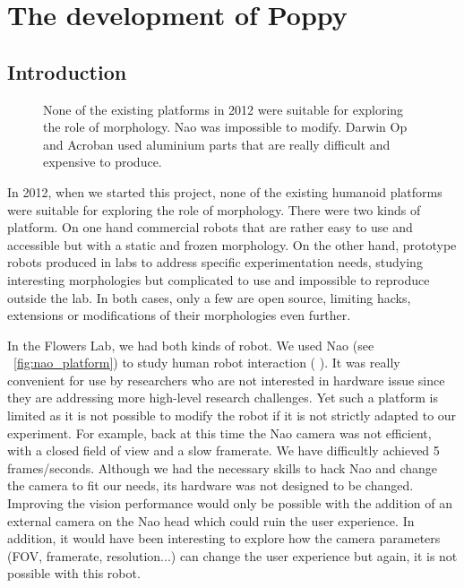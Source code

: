 
\cleartoleftpage

\chapter{The development of Poppy} %
\label{cha:poppy-dev}

\section{Introduction} %

\begin{figure}[tb]
\centering
    \hfil
    \hfil
    \caption{None of the existing platforms in 2012 were suitable for exploring the role of morphology. Nao was impossible to modify. Darwin Op and Acroban used aluminium parts that are really difficult and expensive to produce.}
    \label{fig:2012_Humanoids}
\end{figure}

In 2012, when we started this project, none of the existing humanoid platforms were suitable for exploring the role of morphology. There were two kinds of platform. On one hand commercial robots that are rather easy to use and accessible but with a static and frozen morphology. On the other hand, prototype robots produced in labs to address specific experimentation needs, studying interesting morphologies but complicated to use and impossible to reproduce outside the lab. In both cases, only a few are open source, limiting hacks, extensions or modifications of their morphologies even further.

In the Flowers Lab, we had both kinds of robot. We used Nao (see \figurename~\ref{fig:nao_platform}) to study human robot interaction (\cite{rouanet2009integrated} \cite{rouanet2012apprendre}). It was really convenient for use by researchers who are not interested in hardware issue since they are addressing more high-level research challenges. Yet such a platform is limited as it is not possible to modify the robot if it is not strictly adapted to our experiment. For example, back at this time the Nao camera was not efficient, with a closed field of view and a slow framerate. We have difficultly achieved 5 frames/seconds. Although we had the necessary skills to hack Nao and change the camera to fit our needs, its hardware was not designed to be changed. Improving the vision performance would only be possible with the addition of an external camera on the Nao head which could ruin the user experience. In addition, it would have been interesting to explore how the camera parameters (FOV, framerate, resolution...) can change the user experience but again, it is not possible with this robot.


